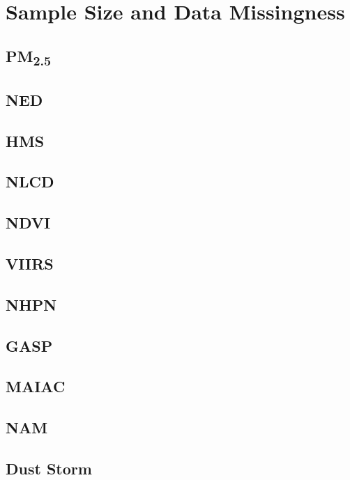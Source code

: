 \section{Sample Size and Data Missingness}

\subsection{PM\textsubscript{2.5}}

\subsection{NED}

\subsection{HMS}

\subsection{NLCD}

\subsection{NDVI}

\subsection{VIIRS}

\subsection{NHPN}

\subsection{GASP}

\subsection{MAIAC}

\subsection{NAM}

\subsection{Dust Storm}